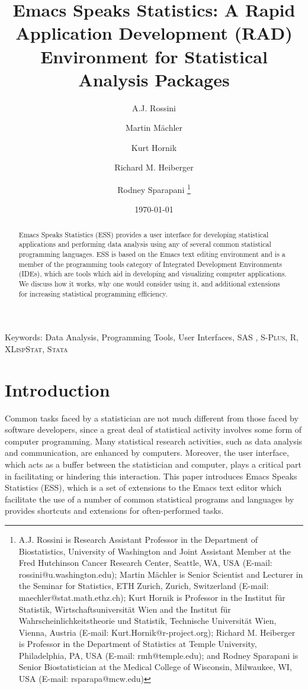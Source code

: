\documentclass{article}
\title{Emacs Speaks Statistics:  A Rapid Application Development (RAD)
  Environment for Statistical Analysis Packages}
\author{A.J. Rossini \and Martin M{\"a}chler \and Kurt Hornik \and Richard
  M. Heiberger \and Rodney Sparapani \footnote{%
    A.J. Rossini is Research Assistant Professor in the Department of
    Biostatistics, University of Washington and Joint Assistant Member at
    the Fred Hutchinson Cancer Research Center, Seattle, WA, USA
    (E-mail: rossini@u.washington.edu);
    Martin M{\"a}chler is Senior Scientist and Lecturer in the Seminar for
    Statistics, ETH Zurich, Zurich, Switzerland
    (E-mail: maechler@stat.math.ethz.ch);
    Kurt Hornik is Professor in the Institut f{\"u}r Statistik,
    Wirtschaftsuniversit{\"a}t Wien and the Institut f{\"u}r
    Wahrscheinlichkeitstheorie und Statistik, Technische Universit{\"a}t
    Wien, Vienna, Austria (E-mail: Kurt.Hornik@r-project.org);
    Richard M. Heiberger is Professor in the Department of Statistics at
    Temple University, Philadelphia, PA, USA (E-mail: rmh@temple.edu);
    and Rodney Sparapani is Senior Biostatistician at the Medical College
    of Wisconsin, Milwaukee, WI, USA (E-mail: rsparapa@mcw.edu)}}
\date{\today}
\newcommand*{\SAS}{\textsc{SAS}{\textregistered} }
\newcommand*{\Splus}{\textsc{S-Plus}}
\newcommand*{\XLispStat}{\textsc{XLispStat}}
\newcommand*{\Stata}{\textsc{Stata}}
\begin{document}
\maketitle

\begin{abstract}
  Emacs Speaks Statistics (ESS) provides a user interface for
  developing statistical applications and performing data analysis
  using any of several common statistical programming languages.  ESS
  is based on the Emacs text editing environment and is a member of
  the programming tools category of Integrated Development
  Environments (IDEs), which are tools which aid in developing and
  visualizing computer applications.  We discuss how it works, why one
  would consider using it, and additional extensions for increasing
  statistical programming efficiency.
\end{abstract}

\noindent Keywords: Data Analysis, Programming Tools, User Interfaces, \SAS,
\Splus, R, \XLispStat, \Stata

\baselineskip=2pc

\section{Introduction}
\label{sec:introduction}

Common tasks faced by a statistician are not much different from those
faced by software developers, since a great deal of statistical
activity involves some form of computer programming.  Many
statistical research activities, such as data analysis and
communication, are enhanced by computers.  Moreover, the user
interface, which acts as a buffer between the statistician and
computer, plays a critical part in facilitating or hindering this
interaction.  This paper introduces Emacs Speaks Statistics (ESS),
which is a set of extensions to the Emacs text editor which facilitate
the use of a number of common statistical programs and languages by
provides shortcuts and extensions for often-performed tasks.

\end{document}
